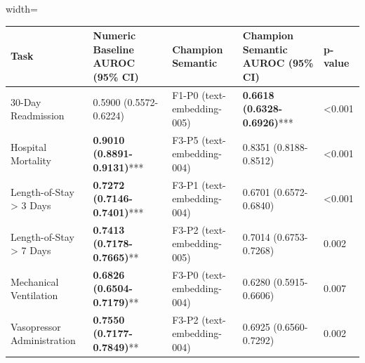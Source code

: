 \documentclass{article}
\begin{document}
\begin{table}[ht]
\centering
\begin{adjustbox}{width=\textwidth}
\begin{tabular}{lllll}
\toprule
Task & Numeric Baseline AUROC (95\% CI) & Champion Semantic & Champion Semantic AUROC (95\% CI) & p-value \\
\midrule
30-Day Readmission & 0.5900 (0.5572-0.6224) & F1-P0 (text-embedding-005) & \textbf{0.6618 (0.6328-0.6926)}*** & <0.001 \\
Hospital Mortality & \textbf{0.9010 (0.8891-0.9131)}*** & F3-P5 (text-embedding-004) & 0.8351 (0.8188-0.8512) & <0.001 \\
Length-of-Stay \textgreater{} 3 Days & \textbf{0.7272 (0.7146-0.7401)}*** & F3-P1 (text-embedding-004) & 0.6701 (0.6572-0.6840) & <0.001 \\
Length-of-Stay \textgreater{} 7 Days & \textbf{0.7413 (0.7178-0.7665)}** & F3-P2 (text-embedding-005) & 0.7014 (0.6753-0.7268) & 0.002 \\
Mechanical Ventilation & \textbf{0.6826 (0.6504-0.7179)}** & F3-P0 (text-embedding-004) & 0.6280 (0.5915-0.6606) & 0.007 \\
Vasopressor Administration & \textbf{0.7550 (0.7177-0.7849)}** & F3-P2 (text-embedding-004) & 0.6925 (0.6560-0.7292) & 0.002 \\
\bottomrule
\end{tabular}

\end{adjustbox}
\end{table}
\end{document}
